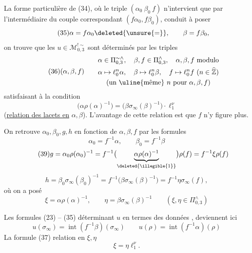 La forme particulière de (34), où le triple $(\alpha_0\ \beta_0\ f)$ n'intervient que par l'intermédiaire du couple correspondant $(f\alpha_0,f\beta_0)$, conduit à poser
\[
\tag{35}
\alpha=f\alpha_0\deleted{\unsure{=}},\qquad\beta=f\beta_0,
\]
on trouve que les $u\in\mathcal{M}_{0,3}^{!\sim}$ sont déterminés par les triples
\[
\tag{36}
(\alpha,\beta,f)\qquad
\begin{gathered}
\alpha\in\Pi_{0,3}^{\sim\wedge},\quad\beta,f\in\Pi_{0,3}^{\wedge},\quad
\alpha,\beta,f\ \text{modulo}\\
\alpha\mapsto\ell_0^n\alpha,\quad\beta\mapsto\ell_0^n\beta,\quad
f\mapsto\ell_0^n f\ (n\in\widehat{\mathbb Z})\\
\text{(un \uline{même} }n\text{ pour }\alpha,\beta,f\text{)}
\end{gathered}
\]
satisfaisant à la condition
\[
\tag{37}
\boxed{\bigl(\alpha\rho(\alpha)^{-1}\bigr)
=\bigl(\beta\sigma_\infty(\beta)^{-1}\bigr)\cdot\ell_1^\nu}
\]
(\uline{relation des lacets en} $\alpha,\beta$). L'avantage de cette relation est que $f$ n'y figure plus.

On retrouve $\alpha_0,\beta_0,g,h$ en fonction de $\alpha,\beta,f$ par les formules
\[
\tag{38}
\alpha_0=f^{-1}\alpha,\qquad\beta_0=f^{-1}\beta
\]
\[
\tag{39}
g=\alpha_0\rho(\alpha_0)^{-1}
=f^{-1}\bigl(\underbrace{\alpha\rho(\alpha)^{-1}}_{\deleted{\illegible{1}}}\bigr)\rho(f)
=f^{-1}\xi\rho(f)
\]
\[
\tag{40}
h=\beta_0\sigma_\infty(\beta_0)^{-1}
=f^{-1}\bigl(\beta\sigma_\infty(\beta)^{-1}\bigr)
=f^{-1}\eta\sigma_\infty(f),
\]
où on a posé
\[
\tag{41}
\xi=\alpha\rho(\alpha)^{-1},\qquad
\eta=\beta\sigma_\infty(\beta)^{-1}
\qquad(\xi,\eta\in\Pi_{0,3}^{\wedge})
\]


Les formules (23) -- (35) déterminant $u$ en termes des données , deviennent ici
\[
\tag{42}
u(\sigma_\infty)=\operatorname{int}(f^{-1}\beta)(\sigma_\infty)
\qquad u(\rho)=\operatorname{int}(f^{-1}\alpha)(\rho)
\]
La formule (37)  relation en $\xi,\eta$
\[
\tag{43}
\xi=\eta\ell_1^\nu.
\]

